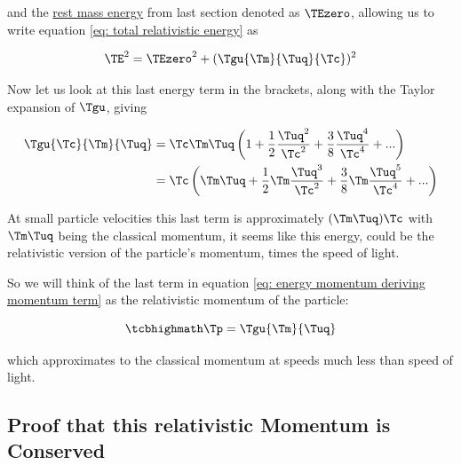 \begin{derivation}
	and the \hyperlink{def-rest-mass-energy}{rest mass energy} from last section denoted as $\TEzero $, allowing us to write equation \eqref{eq: total relativistic energy} as

	\begin{equation}
		\label{eq: energy momentum deriving momentum term}
		\TE ^2 = \TEzero ^2 + (\Tgu {\Tm }{\Tuq }{\Tc })^2
	\end{equation}

	Now let us look at this last energy term in the brackets, along with the Taylor expansion of $\Tgu $, giving

	\begin{equation}
		\begin{aligned}
			\Tgu  {\Tc }{\Tm }{\Tuq } & = {\Tc }{\Tm }{\Tuq } \left(1 + \frac{1}{2}\frac{\Tuq ^2}{ \Tc ^2} + \frac{3}{8}\frac{\Tuq ^4}{\Tc ^4} + ...
			\right)                                                                                                               \\
			                       & ={\Tc }\left( {\Tm }{\Tuq } + \frac{1}{2}\Tm  \frac{\Tuq ^3}{ \Tc ^2} + \frac{3}{8}\Tm \frac{\Tuq ^5}{\Tc ^4} + ...
			\right)
		\end{aligned}
	\end{equation}

	At small particle velocities this last term is approximately $({\Tm }{\Tuq }){\Tc }$ with ${\Tm }{\Tuq }$ being the classical momentum, it seems like this energy, could be the relativistic version of the particle's momentum, times the speed of light.

\end{derivation}

So we will think of the last term in equation \eqref{eq: energy momentum deriving momentum term} as the relativistic momentum of the particle:

\begin{equation}
	\label{eq: relativistic momentum}
	\mhl{
		\Tp  = \Tgu  {\Tm }{\Tuq }
	}
\end{equation}

which approximates to the classical momentum at speeds much less than speed of light.

\subsection{Proof that this relativistic Momentum is Conserved}\label{subsect: Proof that this relativistic Momentum is Conserved}

